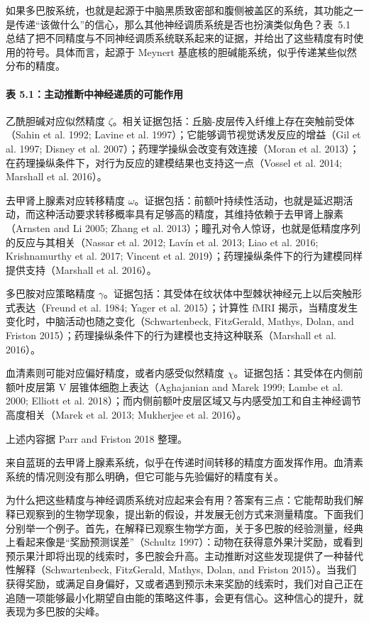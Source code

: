 如果多巴胺系统，也就是起源于中脑黑质致密部和腹侧被盖区的系统，其功能之一是传递“该做什么”的信心，那么其他神经调质系统是否也扮演类似角色？表~5.1 总结了把不同精度与不同神经调质系统联系起来的证据，并给出了这些精度有时使用的符号。具体而言，起源于 Meynert 基底核的胆碱能系统，似乎传递某些似然分布的精度。

\paragraph{表 5.1：主动推断中神经递质的可能作用}

乙酰胆碱对应似然精度 $\zeta$。相关证据包括：丘脑-皮层传入纤维上存在突触前受体（Sahin et al. 1992; Lavine et al. 1997）；它能够调节视觉诱发反应的增益（Gil et al. 1997; Disney et al. 2007）；药理学操纵会改变有效连接（Moran et al. 2013）；在药理操纵条件下，对行为反应的建模结果也支持这一点（Vossel et al. 2014; Marshall et al. 2016）。

去甲肾上腺素对应转移精度 $\omega$。证据包括：前额叶持续性活动，也就是延迟期活动，而这种活动要求转移概率具有足够高的精度，其维持依赖于去甲肾上腺素（Arnsten and Li 2005; Zhang et al. 2013）；瞳孔对令人惊讶，也就是低精度序列的反应与其相关（Nassar et al. 2012; Lavín et al. 2013; Liao et al. 2016; Krishnamurthy et al. 2017; Vincent et al. 2019）；药理操纵条件下的行为建模同样提供支持（Marshall et al. 2016）。

多巴胺对应策略精度 $\gamma$。证据包括：其受体在纹状体中型棘状神经元上以后突触形式表达（Freund et al. 1984; Yager et al. 2015）；计算性 fMRI 揭示，当精度发生变化时，中脑活动也随之变化（Schwartenbeck, FitzGerald, Mathys, Dolan, and Friston 2015）；药理操纵条件下的行为建模也支持这种联系（Marshall et al. 2016）。

血清素则可能对应偏好精度，或者内感受似然精度 $\chi$。证据包括：其受体在内侧前额叶皮层第 V 层锥体细胞上表达（Aghajanian and Marek 1999; Lambe et al. 2000; Elliott et al. 2018）；而内侧前额叶皮层区域又与内感受加工和自主神经调节高度相关（Marek et al. 2013; Mukherjee et al. 2016）。

上述内容据 Parr and Friston 2018 整理。

来自蓝斑的去甲肾上腺素系统，似乎在传递时间转移的精度方面发挥作用。血清素系统的情况则没有那么明确，但它可能与先验偏好的精度有关。

为什么把这些精度与神经调质系统对应起来会有用？答案有三点：它能帮助我们解释已观察到的生物学现象，提出新的假设，并发展无创方式来测量精度。下面我们分别举一个例子。首先，在解释已观察生物学方面，关于多巴胺的经验测量，经典上看起来像是“奖励预测误差”（Schultz 1997）：动物在获得意外果汁奖励，或看到预示果汁即将出现的线索时，多巴胺会升高。主动推断对这些发现提供了一种替代性解释（Schwartenbeck, FitzGerald, Mathys, Dolan, and Friston 2015）。当我们获得奖励，或满足自身偏好，又或者遇到预示未来奖励的线索时，我们对自己正在追随一项能够最小化期望自由能的策略这件事，会更有信心。这种信心的提升，就表现为多巴胺的尖峰。

